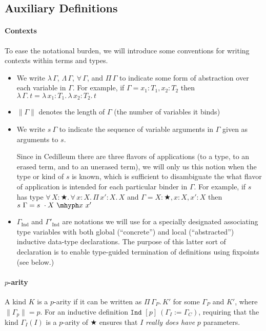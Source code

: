 \documentclass{article}
\newcommand{\ann}[2]{#1\! : \! #2}
\newcommand{\abs}[4]{{#1}\, #2\! : \! #3.\, #4}
\newcommand{\absu}[3]{{#1}\, #2.\, #3}
\newcommand{\indast}[3]{\texttt{Ind } [#1]\ (#2 := #3)}
\newcommand{\lenc}[1]{\|#1\|}
\begin{document}
\subsection{Auxiliary Definitions}

\paragraph{Contexts}
To ease the notational burden, we will introduce some conventions for writing
contexts within terms and types.

\begin{itemize}
\item We write $\lambda\,\Gamma$, $\Lambda\,\Gamma$, $\forall\, \Gamma$, and
  $\Pi\, \Gamma$ to indicate some form of abstraction over each variable in
  $\Gamma$. For example, if $\Gamma = \ann{x_1}{T_1},\ann{x_2}{T_2}$ then
  $\absu{\lambda}{\Gamma}{t} =
  \abs{\lambda}{x_1}{T_1}{\abs{\lambda}{x_2}{T_2}{t}}$
\item $\lenc{\Gamma}$ denotes the length of $\Gamma$ (the number of variables it
  binds)
\item We write $s\ \Gamma$ to indicate the sequence of variable arguments in
  $\Gamma$ given as arguments to $s$.

  Since in Cedilleum there are three flavors of applications (to a type, to an
  erased term, and to an unerased term), we will only us this notion when the type
  or kind of $s$ is known, which is sufficient to disambiguate the what flavor of
  application is intended for each particular binder in $\Gamma$. For example,
  if $s$ has type
  $\abs{\forall}{X}{★}{\abs{\forall}{x}{X}{\abs{\Pi}{x'}{X}{X}}}$ and $\Gamma =
  \ann{X}{★},\ann{x}{X},\ann{x'}{X}$ then $s\ \Gamma = s\ \cdot X\ \mhyph x\ x'$
\item $\Gamma_{\text{Ind}}$ and $\Gamma'_{\text{Ind}}$ are notations we will use
  for a specially designated associating type variables with both global
  (``concrete'') and local (``abstracted'') inductive data-type declarations.
  The purpose of this latter sort of declaration is to enable type-guided
  termination of definitions using fixpoints (see below.)
\end{itemize}

\paragraph{$p$-arity}

A kind $K$ is a $p$-arity if it can be written as $\absu{\Pi}{\Gamma_P}{K'}$ for
some $\Gamma_P$ and $K'$, where $\lenc{\Gamma_p} = p$. For an inductive definition
$\indast{p}{\Gamma_I}{\Gamma_C}$, requiring that the kind $\Gamma_{I}(I)$ is a $p$-arity
of ★ ensures that $I$ \textit{really does have} $p$ parameters.
\end{document}
